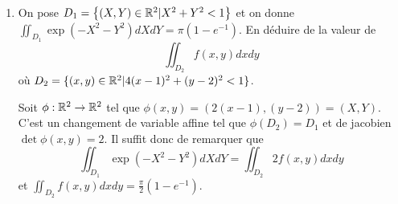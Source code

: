\documentclass{tp_um}
\begin{document}
\begin{enumerate}
		\bigskip


	\item On pose $D_1=\left\{ (X,Y)\in\mathbb{R}^2 | X^2 + Y^2 < 1 \right\}$ et on donne $\iint_{D_1} \exp(-X^2 -Y^2 )dXdY  = \pi(1 - e^{-1})$.
En déduire de  la valeur de 
\[
\iint_{D_2} f(x,y) dxdy\] où $D_2 = \{ (x,y)\in\mathbb{R}^2 | 4(x-1)^2 +  (y-2)^2  < 1 \}$.


		\bigskip


Soit $\phi: \mathbb{R}^2 \to \mathbb{R}^2$ tel que $\phi(x,y) = (2(x-1), (y-2)) = (X,Y)$. C'est un changement de variable affine tel que $\phi(D_2) = D_1$ et de jacobien $\det \phi(x,y) =2$. Il suffit donc de remarquer que 
\[
	 \iint_{D_1} \exp(-X^2 -Y^2 )dXdY = \iint_{D_2} 2f(x,y) dxdy
\]
et $\iint_{D_2} f(x,y) dxdy   = \frac{\pi}{2}(1 - e^{-1})$.

\end{enumerate}

\end{document}
